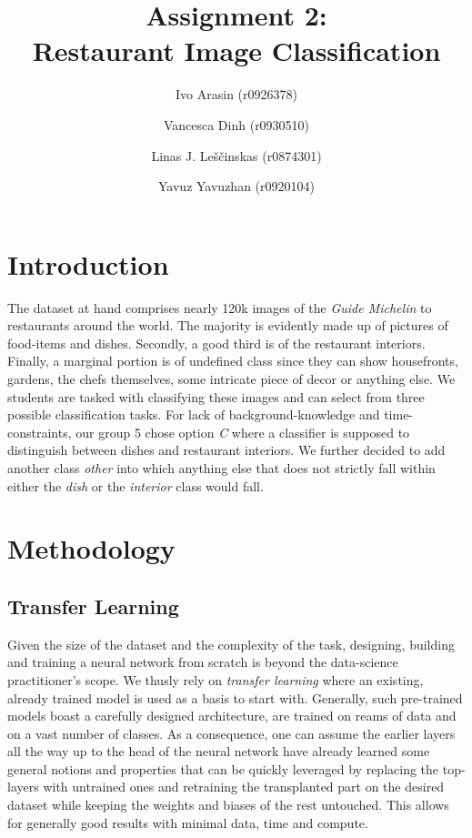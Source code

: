 \documentclass[11pt, oneside]{article}   	%
\title{Assignment 2: \\ Restaurant Image Classification}
\author{\centering Ivo Arasin (r0926378) \and Vancesca Dinh (r0930510) \and Linas J. Leščinskas (r0874301) \and Yavuz Yavuzhan (r0920104)}
\begin{document}
\maketitle
\section{Introduction}
The dataset at hand comprises nearly 120k images of the \textit{Guide Michelin} to restaurants around the world. The majority is evidently made up of pictures of food-items and dishes. Secondly, a good third is of the restaurant interiors. Finally, a marginal portion is of undefined class since they can show housefronts, gardens, the chefs themselves, some intricate piece of decor or anything else. 
We students are tasked with classifying these images and can select from three possible classification tasks. For lack of background-knowledge and time-constraints, our group 5 chose option \textit{C} where a classifier is supposed to distinguish between dishes and restaurant interiors. We further decided to add another class \textit{other} into which anything else that does not strictly fall within either the \textit{dish} or the \textit{interior} class would fall.

\section{Methodology}
\subsection{Transfer Learning}
Given the size of the dataset and the complexity of the task, designing, building and training a neural network from scratch is beyond the data-science practitioner's scope. We thusly rely on \textit{transfer learning} where an existing, already trained model is used as a basis to start with. Generally, such pre-trained models boast a carefully designed architecture, are trained on reams of data and on a vast number of classes. As a consequence, one can assume the earlier layers all the way up to the head of the neural network have already learned some general notions and properties that can be quickly leveraged by replacing the top-layers with untrained ones and retraining the transplanted part on the desired dataset while keeping the weights and biases of the rest untouched. This allows for generally good results with minimal data, time and compute.
\end{document}
